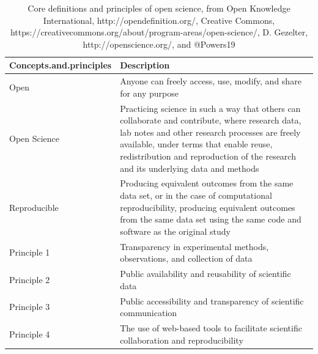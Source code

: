 \documentclass[fleqn,10pt,lineno]{wlpeerj} %
\begin{document}
\begin{table}

\caption{\label{tab:osprinc}Core definitions and principles of open science, from Open Knowledge International, http://opendefinition.org/, Creative Commons, https://creativecommons.org/about/program-areas/open-science/, D. Gezelter, http://openscience.org/, and @Powers19}
\centering
\begin{tabular}[t]{ll}
\toprule
Concepts.and.principles & Description\\
\midrule
Open & Anyone can freely access, use, modify, and share for any purpose\\
Open Science & Practicing science in such a way that others can collaborate and contribute, where research data, lab notes and other research processes are freely available, under terms that enable reuse, redistribution and reproduction of the research and its underlying data and methods\\
Reproducible & Producing equivalent outcomes from the same data set, or in the case of computational reproducibility, producing equivalent outcomes from the same data set using the same code and software as the original study\\
Principle 1 & Transparency in experimental methods, observations, and collection of data\\
Principle 2 & Public availability and reusability of scientific data\\
\addlinespace
Principle 3 & Public accessibility and transparency of scientific communication\\
Principle 4 & The use of web-based tools to facilitate scientific collaboration and reproducibility\\
\bottomrule
\end{tabular}
\end{table}
\end{document}
